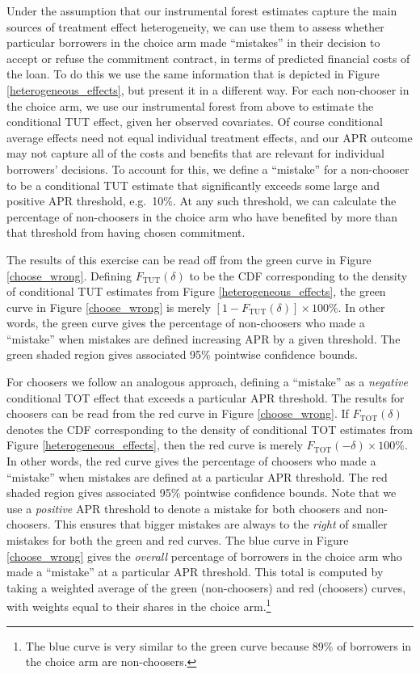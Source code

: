 \documentclass[12pt, a4paper]{article}
\begin{document}
Under the assumption that our instrumental forest estimates capture the main sources of treatment effect heterogeneity, we can use them to assess whether particular borrowers in the choice arm made ``mistakes'' in their decision to accept or refuse the commitment contract, in terms of predicted financial costs of the loan.
To do this we use the same information that is depicted in Figure \ref{heterogeneous_effects}, but present it in a different way.
For each non-chooser in the choice arm, we use our instrumental forest from above to estimate the conditional TUT effect, given her observed covariates.
Of course conditional average effects need not equal individual treatment effects, and our APR outcome may not capture all of the costs and benefits that are relevant for individual borrowers' decisions.
To account for this, we define a ``mistake'' for a non-chooser to be a conditional TUT estimate that significantly exceeds some large and positive APR threshold, e.g.\ 10\%. 
At any such threshold, we can calculate the percentage of non-choosers in the choice arm who have benefited by more than that threshold from having chosen commitment. 


The results of this exercise can be read off from the green curve in Figure \ref{choose_wrong}.
Defining $F_{\text{TUT}}(\delta)$ to be the CDF corresponding to the density of conditional TUT estimates from Figure \ref{heterogeneous_effects}, the green curve in Figure \ref{choose_wrong} is merely $[1 - F_{\text{TUT}}(\delta)] \times 100\%$.
In other words, the green curve gives the percentage of non-choosers who made a ``mistake'' when mistakes are defined increasing APR by a given threshold.
The green shaded region gives associated 95\% pointwise confidence bounds.

For choosers we follow an analogous approach, defining a ``mistake'' as a \emph{negative} conditional TOT effect that exceeds a particular APR threshold.
The results for choosers can be read from the red curve in Figure \ref{choose_wrong}.
If $F_{\text{TOT}}(\delta)$ denotes the CDF corresponding to the density of conditional TOT estimates from Figure \ref{heterogeneous_effects}, then the red curve is merely $F_{\text{TOT}}(-\delta) \times 100\%$.
In other words, the red curve gives the percentage of choosers who made a ``mistake'' when mistakes are defined at a particular APR threshold.
The red shaded region gives associated 95\% pointwise confidence bounds.
Note that we use a \emph{positive} APR threshold to denote a mistake for both choosers and non-choosers. 
This ensures that bigger mistakes are always to the \emph{right} of smaller mistakes for both the green and red curves.
The blue curve in Figure \ref{choose_wrong} gives the \emph{overall} percentage of borrowers in the choice arm who made a ``mistake'' at a particular APR threshold.
This total is computed by taking a weighted average of the green (non-choosers) and red (choosers) curves, with weights equal to their shares in the choice arm.\footnote{The blue curve is very similar to the green curve because 89\% of borrowers in the choice arm are non-choosers.}
\end{document}

